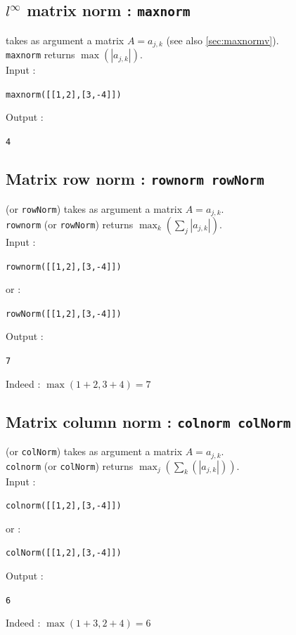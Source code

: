 \documentclass[a4paper,11pt]{book}
\begin{document}
\subsection{$l^\infty$ matrix norm : {\tt maxnorm}}\label{sec:maxnormm}
 takes as argument a matrix $A=a_{j,k}$ (see also \ref{sec:maxnormv}).\\
{\tt maxnorm} returns $ \max(|a_{j,k}|)$.\\
Input :
\begin{center}{\tt maxnorm([[1,2],[3,-4]])}\end{center}
Output :
\begin{center}{\tt 4}\end{center}

\subsection{Matrix row norm : {\tt rownorm rowNorm}}
 (or {\tt rowNorm}) takes as argument a matrix $A=a_{j,k}$.\\
{\tt rownorm} (or {\tt rowNorm}) returns $\max_k(\sum_j |a_{j,k}|)$.\\
Input :
\begin{center}{\tt rownorm([[1,2],[3,-4]])}\end{center}
or :
\begin{center}{\tt rowNorm([[1,2],[3,-4]])}\end{center}
Output :
\begin{center}{\tt 7}\end{center}
Indeed : $\max(1+2,3+4)=7$

\subsection{Matrix column norm : {\tt colnorm colNorm}}
 (or {\tt colNorm}) takes as argument a matrix 
$A=a_{j,k}$.\\
{\tt colnorm} (or {\tt colNorm}) returns $\max_j(\sum_k(|a_{j,k}|))$.\\
Input :
\begin{center}{\tt colnorm([[1,2],[3,-4]])}\end{center}
or :
\begin{center}{\tt colNorm([[1,2],[3,-4]])}\end{center}
Output :
\begin{center}{\tt 6}\end{center}
Indeed : $\max(1+3,2+4)=6$
\end{document}
